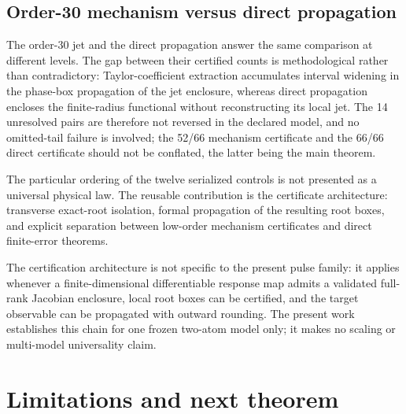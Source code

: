 \subsection{Order-30 mechanism versus direct propagation}

The order-30 jet and the direct propagation answer the same comparison at different
levels. The gap between their certified counts is methodological rather than
contradictory: Taylor-coefficient extraction accumulates interval widening in the
phase-box propagation of the jet enclosure, whereas direct propagation encloses the
finite-radius functional without reconstructing its local jet. The 14 unresolved pairs are
therefore not reversed in the declared model, and no omitted-tail failure is involved;
the 52/66 mechanism certificate and the 66/66 direct certificate should not be conflated,
the latter being the main theorem.

The particular ordering of the twelve serialized controls is not presented as a universal
physical law. The reusable contribution is the certificate architecture: transverse
exact-root isolation, formal propagation of the resulting root boxes, and explicit
separation between low-order mechanism certificates and direct finite-error theorems.

The certification architecture is not specific to the present pulse family: it applies
whenever a finite-dimensional differentiable response map admits a validated full-rank
Jacobian enclosure, local root boxes can be certified, and the target observable can be
propagated with outward rounding. The present work establishes this chain for one frozen
two-atom model only; it makes no scaling or multi-model universality claim.

\section{Limitations and next theorem}\label{sec:limitations}

